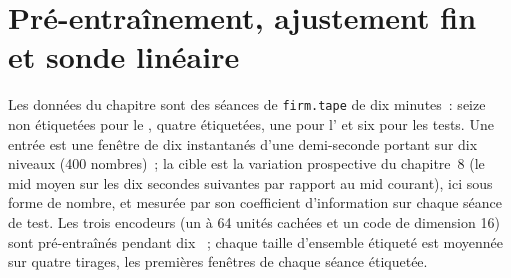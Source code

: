 \section{Pré-entraînement, ajustement fin et sonde linéaire}

Les données du chapitre sont des séances de \texttt{firm.tape} de dix minutes~: seize non étiquetées pour le , quatre
étiquetées, une pour l' et six pour les tests. Une entrée est une fenêtre de dix instantanés d'une demi-seconde portant sur dix niveaux (400
nombres)~; la cible est la variation prospective du chapitre~8 (le mid moyen sur les dix secondes suivantes par rapport au mid courant),
ici sous forme de nombre, et mesurée par son coefficient d'information sur chaque séance de test. Les trois encodeurs (un  à 64
unités cachées et un code de dimension 16) sont pré-entraînés pendant dix ~; chaque taille d'ensemble étiqueté est moyennée sur quatre
tirages, les premières fenêtres de chaque séance étiquetée.

